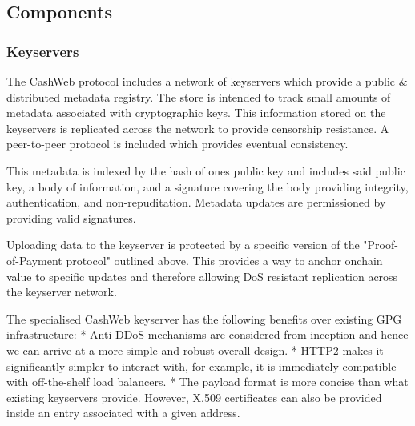 \documentclass{article}
\begin{document}
\subsection{Components}

\subsubsection{Keyservers}

The CashWeb protocol includes a network of keyservers which provide a public \& distributed metadata registry. The store is intended to track small amounts of metadata associated with cryptographic keys. This information stored on the keyservers is replicated across the network to provide censorship resistance. A peer-to-peer protocol is included which provides eventual consistency.

This metadata is indexed by the hash of ones public key and includes said public key, a body of information, and a signature covering the body providing integrity, authentication, and non-repuditation. Metadata updates are permissioned by providing valid signatures.



Uploading data to the keyserver is protected by a specific version of the "Proof-of-Payment protocol" outlined above. This provides a way to anchor onchain value to specific updates and therefore allowing DoS resistant replication across the keyserver network.

The specialised CashWeb keyserver has the following benefits over existing GPG infrastructure:
* Anti-DDoS mechanisms are considered from inception and hence we can arrive at a more simple and robust overall design.
* HTTP2 makes it significantly simpler to interact with, for example, it is immediately compatible with off-the-shelf load balancers.
* The payload format is more concise than what existing keyservers provide. However, X.509 certificates can also be provided inside an entry associated with a given address.
\end{document}
